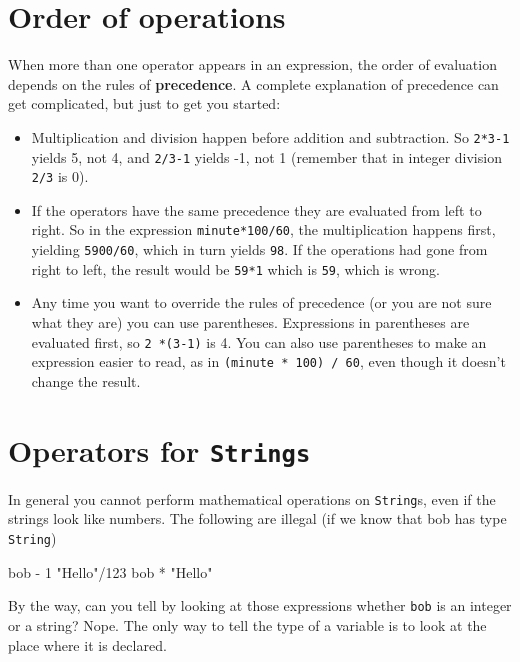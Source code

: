 \section{Order of operations}

When more than one operator appears in an expression, the order
of evaluation depends on the rules of {\bf precedence}.  A
complete explanation of precedence can get complicated, but
just to get you started:

\begin{itemize}

\item Multiplication and division happen before
addition and subtraction.  So {\tt 2*3-1} yields 5, not 4, and
{\tt 2/3-1} yields -1, not 1 (remember that in integer division
{\tt 2/3} is 0).

\item If the operators have the same precedence they are evaluated
from left to right.  So in the expression {\tt minute*100/60},
the multiplication happens first, yielding {\tt 5900/60}, which
in turn yields {\tt 98}.  If the operations had gone from right
to left, the result would be {\tt 59*1} which is {\tt 59}, which
is wrong.

\item Any time you want to override the rules of precedence (or
you are not sure what they are) you can use parentheses.  Expressions
in parentheses are evaluated first, so {\tt 2 *(3-1)} is 4.
You can also use parentheses to make an expression easier to
read, as in {\tt(minute * 100) / 60}, even though it doesn't
change the result.

\end{itemize}


\section{Operators for {\tt Strings}}

In general you cannot perform mathematical operations on {\tt String}s,
even if the strings look like numbers.  The following are
illegal (if we know that bob has type {\tt String})

\begin{verbatimtab}
bob - 1         "Hello"/123      bob * "Hello"
\end{verbatimtab}
%
By the way, can you tell by looking at those expressions
whether {\tt bob} is an integer or a string?  Nope.
The only way to tell the type of a variable is to look at
the place where it is declared.

